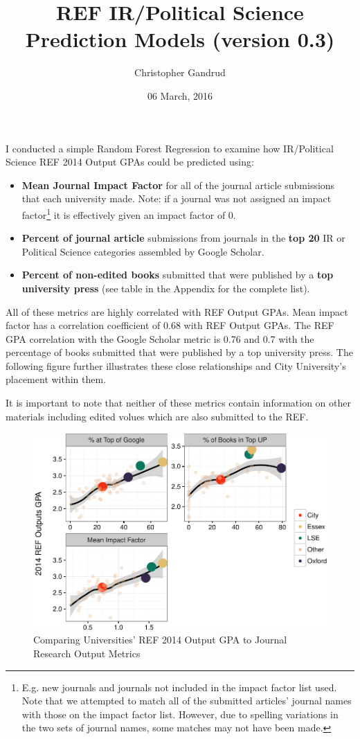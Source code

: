 \documentclass[]{article}
\title{REF IR/Political Science Prediction Models (version 0.3)}
\author{Christopher Gandrud}
\date{06 March, 2016}
\let\rmarkdownfootnote\footnote%
\def\footnote{\protect\rmarkdownfootnote}
\begin{document}
\maketitle

I conducted a simple Random Forest Regression to examine how
IR/Political Science REF 2014 Output GPAs could be predicted using:

\begin{itemize}
\item
  \textbf{Mean Journal Impact Factor} for all of the journal article
  submissions that each university made. Note: if a journal was not
  assigned an impact factor\footnote{E.g. new journals and journals not
    included in the impact factor list used. Note that we attempted to
    match all of the submitted articles' journal names with those on the
    impact factor list. However, due to spelling variations in the two
    sets of journal names, some matches may not have been made.} it is
  effectively given an impact factor of 0.
\item
  \textbf{Percent of journal article} submissions from journals in the
  \textbf{top 20} IR or Political Science categories assembled by Google
  Scholar.
\item
  \textbf{Percent of non-edited books} submitted that were published by
  a \textbf{top university press} (see table in the Appendix for the
  complete list).
\end{itemize}

All of these metrics are highly correlated with REF Output GPAs. Mean
impact factor has a correlation coefficient of 0.68 with REF Output
GPAs. The REF GPA correlation with the Google Scholar metric is 0.76 and
0.7 with the percentage of books submitted that were published by a top
university press. The following figure further illustrates these close
relationships and City University's placement within them.

It is important to note that neither of these metrics contain
information on other materials including edited volues which are also
submitted to the REF.

\begin{figure}[htbp]
\centering
\includegraphics{README_files/figure-latex/descript-1.pdf}
\caption{Comparing Universities' REF 2014 Output GPA to Journal Research
Output Metrics}
\end{figure}
\end{document}
